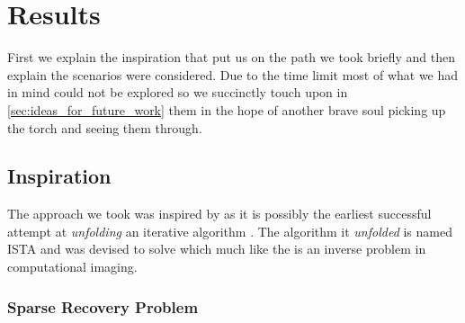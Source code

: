 \chapter{Results}\label{ch:results}

First we explain the inspiration that put us on the path we took briefly and then explain the scenarios were considered. 
Due to the time limit most of what we had in mind could not be explored so we succinctly touch upon in \cref{sec:ideas_for_future_work} them in the hope of another 
brave soul picking up the torch and seeing them through.  

\section{Inspiration}

The approach we took was inspired by \cite{Gregor2010} as it is possibly the earliest successful attempt at \emph{unfolding}
an iterative algorithm \cite{Monga2019}. The algorithm it \emph{unfolded} is named \ac{ISTA}\cite{Daubechies2003} and 
was devised to solve \srp\index{\srp} which much like the \pr\cite{Shechtman2015}\cite{Jaganathan2015}\index{\pr} is an 
inverse problem\cite{Kirsch2021} in computational imaging\cite{Khare2023}.
\subsection{Sparse Recovery Problem}

